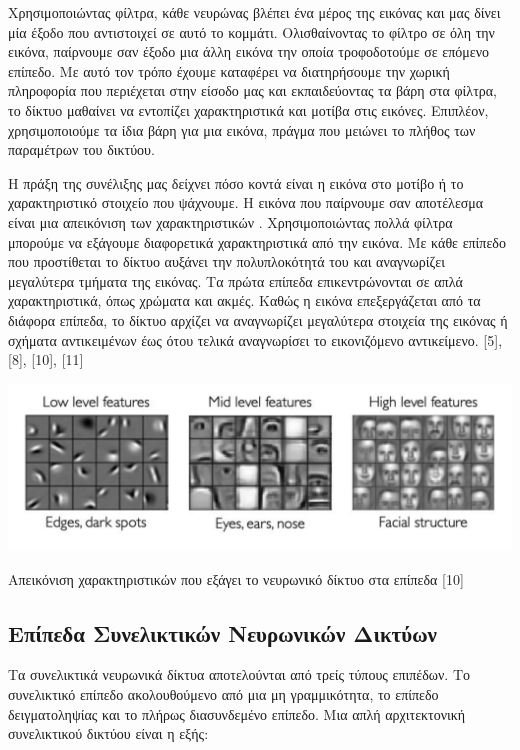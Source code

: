 Χρησιμοποιώντας φίλτρα, κάθε νευρώνας βλέπει ένα μέρος της εικόνας και μας δίνει μία έξοδο που αντιστοιχεί σε αυτό το κομμάτι. Ολισθαίνοντας το φίλτρο σε όλη την εικόνα,  παίρνουμε σαν έξοδο μια άλλη εικόνα την οποία τροφοδοτούμε σε επόμενο επίπεδο. Με αυτό τον τρόπο έχουμε καταφέρει να διατηρήσουμε την χωρική πληροφορία που περιέχεται στην είσοδο μας και εκπαιδεύοντας τα βάρη στα φίλτρα, το δίκτυο μαθαίνει  να εντοπίζει χαρακτηριστικά και μοτίβα στις εικόνες. Επιπλέον, χρησιμοποιούμε τα ίδια βάρη για μια εικόνα, πράγμα  που μειώνει  το πλήθος των παραμέτρων του δικτύου.

Η πράξη της συνέλιξης μας δείχνει πόσο  κοντά είναι η εικόνα στο μοτίβο ή το χαρακτηριστικό στοιχείο που ψάχνουμε. Η εικόνα που παίρνουμε σαν αποτέλεσμα είναι μια απεικόνιση των χαρακτηριστικών . Χρησιμοποιώντας πολλά φίλτρα μπορούμε να εξάγουμε διαφορετικά χαρακτηριστικά από την εικόνα. Με κάθε επίπεδο που προστίθεται το δίκτυο αυξάνει την πολυπλοκότητά του και αναγνωρίζει μεγαλύτερα τμήματα της εικόνας. Τα πρώτα επίπεδα επικεντρώνονται σε απλά χαρακτηριστικά, όπως χρώματα και ακμές. Καθώς η εικόνα επεξεργάζεται από τα διάφορα επίπεδα, το δίκτυο αρχίζει να αναγνωρίζει μεγαλύτερα στοιχεία της εικόνας ή σχήματα αντικειμένων έως ότου τελικά αναγνωρίσει το εικονιζόμενο αντικείμενο. [5], [8], [10], [11]
 
\begin{Illustration}[!ht] \centering
\includegraphics[width=\textwidth]{images/image014.png} \caption{Απεικόνιση χαρακτηριστικών που εξάγει το νευρωνικό δίκτυο στα επίπεδα  [10]} 
\label{fig:feature-exptraction}
\end{Illustration} 

\subsection{Επίπεδα Συνελικτικών Νευρωνικών Δικτύων}

Τα συνελικτικά νευρωνικά δίκτυα αποτελούνται από τρείς τύπους επιπέδων. Το συνελικτικό επίπεδο ακολουθούμενο από μια μη γραμμικότητα, το επίπεδο δειγματοληψίας και το πλήρως διασυνδεμένο επίπεδο. Μια απλή αρχιτεκτονική συνελικτικού δικτύου είναι η εξής:

